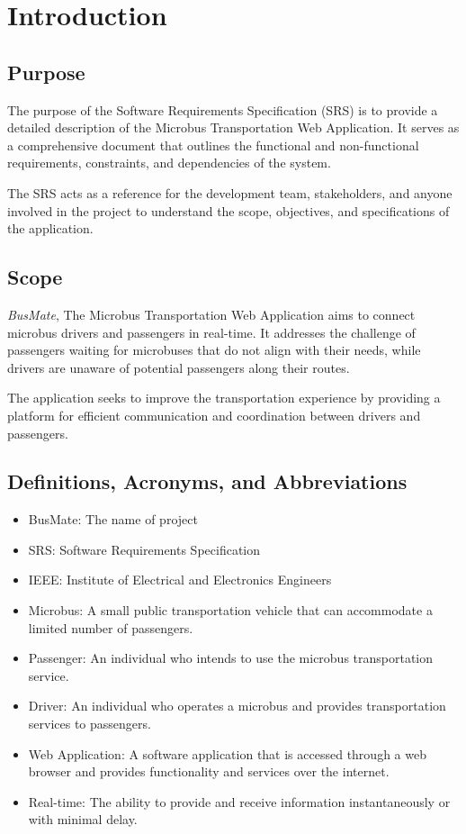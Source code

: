 \documentclass{BusMateSRS}
\def\projectName{BusMate}
\begin{document}

\chapter{Introduction}
\section{Purpose}
The purpose of the Software Requirements Specification (SRS) is to provide
a detailed description of the Microbus Transportation Web Application.
It serves as a comprehensive document that outlines the functional and
non-functional requirements, constraints, and dependencies of the system.

The SRS acts as a reference for the development team, stakeholders, and anyone
involved in the project to understand the scope, objectives, and specifications
of the application.


\section{Scope}
\emph{\projectName}, The Microbus Transportation Web Application aims to
connect microbus drivers and passengers in real-time.
It addresses the challenge of passengers waiting for microbuses that
do not align with their needs, while drivers are unaware of potential passengers
along their routes.

The application seeks to improve the transportation experience by providing
a platform for efficient communication and coordination between drivers and
passengers.


\section{Definitions, Acronyms, and Abbreviations}
\begin{itemize}
	\item {\projectName}:
	      The name of project
	\item SRS:
	      Software Requirements Specification
	\item IEEE:
	      Institute of Electrical and Electronics Engineers
	\item Microbus:
	      A small public transportation vehicle that can accommodate
	      a limited number of passengers.
	\item Passenger:
	      An individual who intends to use the microbus transportation service.
	\item Driver:
	      An individual who operates a microbus and provides transportation
	      services to passengers.
	\item Web Application:
	      A software application that is accessed through a web browser and provides
	      functionality and services over the internet.
	\item Real-time: The ability to provide and receive information
	      instantaneously or with minimal delay.
\end{itemize}
\end{document}
